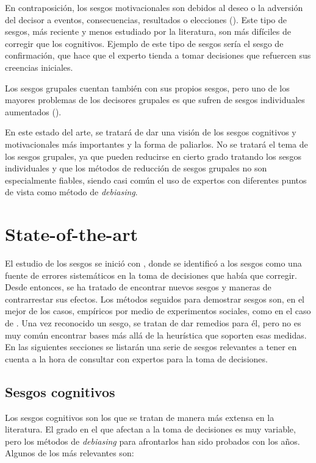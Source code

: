 \documentclass[a4paper,11pt]{article}
\begin{document}
En contraposición, los sesgos motivacionales son debidos al deseo o la adversión del decisor a eventos, consecuencias, resultados o elecciones (\cite{kunda1990}). Este tipo de sesgos, más reciente y menos estudiado por la literatura, son más difíciles de corregir que los cognitivos. Ejemplo de este tipo de sesgos sería el sesgo de confirmación, que hace que el experto tienda a tomar decisiones que refuercen sus creencias iniciales.

Los sesgos grupales cuentan también con sus propios sesgos, pero uno de los mayores problemas de los decisores grupales es que sufren de sesgos individuales aumentados (\cite{kerr2004}).

En este estado del arte, se tratará de dar una visión de los sesgos cognitivos y motivacionales más importantes y la forma de paliarlos. No se tratará el tema de los sesgos grupales, ya que pueden reducirse en cierto grado tratando los sesgos individuales y que los métodos de reducción de sesgos grupales no son especialmente fiables, siendo casi común el uso de expertos con diferentes puntos de vista como método de \textit{debiasing}.


\section{State-of-the-art}
El estudio de los sesgos se inició con \cite{tversky1974}, donde se identificó a los sesgos como una fuente de errores sistemáticos en la toma de decisiones que había que corregir. Desde entonces, se ha tratado de encontrar nuevos sesgos y maneras de contrarrestar sus efectos. Los métodos seguidos para demostrar sesgos son, en el mejor de los casos, empíricos por medio de experimentos sociales, como en el caso de \cite{moore2008}. Una vez reconocido un sesgo, se tratan de dar remedios para él, pero no es muy común encontrar bases más allá de la heurística que soporten esas medidas. En las siguientes secciones se listarán una serie de sesgos relevantes a tener en cuenta a la hora de consultar con expertos para la toma de decisiones.

\subsection{Sesgos cognitivos}
Los sesgos cognitivos son los que se tratan de manera más extensa en la literatura. El grado en el que afectan a la toma de decisiones es muy variable, pero los métodos de \textit{debiasing} para afrontarlos han sido probados con los años. Algunos de los más relevantes son:
\end{document}
